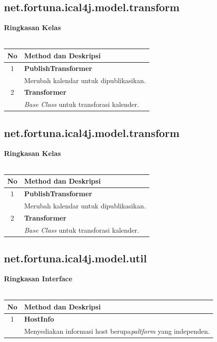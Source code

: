 \subsection{net.fortuna.ical4j.model.transform}

	\noindent \textbf{Ringkasan Kelas}\cite{ical}\\ \\
	\begin{tabular}{|c|p{12cm}|}
		\hline
		\textbf{No} & \textbf{Method dan Deskripsi} \\ \hline \hline
		1 & \textbf{PublishTransformer}\\
			&	Merubah kalendar untuk dipublikasikan.\\ \hline
		2 & \textbf{Transformer}\\
			&	\textit{Base Class} untuk transforasi kalender. \\ \hline
		\end{tabular}
	
	\subsection{net.fortuna.ical4j.model.transform}

	\noindent \textbf{Ringkasan Kelas}\cite{ical}\\ \\
	\begin{tabular}{|c|p{12cm}|}
		\hline
		\textbf{No} & \textbf{Method dan Deskripsi} \\ \hline \hline
		1 & \textbf{PublishTransformer}\\
			&	Merubah kalendar untuk dipublikasikan.\\ \hline
		2 & \textbf{Transformer}\\
			&	\textit{Base Class} untuk transforasi kalender. \\ \hline
		\end{tabular}
		
	\subsection{net.fortuna.ical4j.model.util}

	\noindent \textbf{Ringkasan Interface}\cite{ical}\\ \\
	\begin{tabular}{|c|p{12cm}|}
		\hline
		\textbf{No} & \textbf{Method dan Deskripsi} \\ \hline \hline
		1 & \textbf{HostInfo}\\
			&	Menyediakan informasi host berupa\textit{paltform} yang independen.\\ \hline
	\end{tabular}
	
